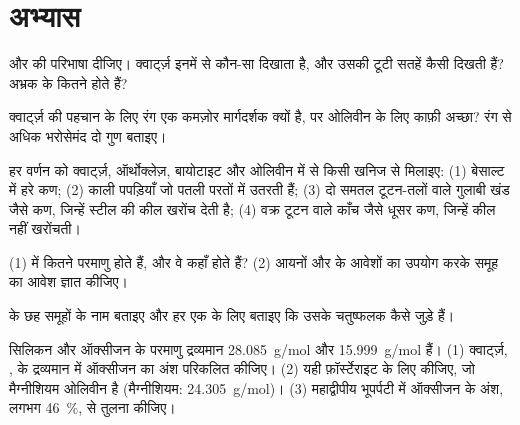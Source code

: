 \section{अभ्यास}

\begin{exercise}[$\star$]\label{exo:g11:minerals:1}
 और  की परिभाषा दीजिए। क्वार्ट्ज़ इनमें से कौन-सा दिखाता है, और उसकी
टूटी सतहें कैसी दिखती हैं? अभ्रक के कितने  होते हैं?
\end{exercise}

\begin{exercise}[$\star$]\label{exo:g11:minerals:2}
क्वार्ट्ज़ की पहचान के लिए रंग एक कमज़ोर मार्गदर्शक क्यों है, पर
ओलिवीन के लिए काफ़ी अच्छा? रंग से अधिक भरोसेमंद दो गुण बताइए।
\end{exercise}

\begin{exercise}[$\star$]\label{exo:g11:minerals:3}
हर वर्णन को क्वार्ट्ज़, ऑर्थोक्लेज़, बायोटाइट और
ओलिवीन में से किसी खनिज से मिलाइए: (1) बेसाल्ट में हरे कण; (2) काली पपड़ियाँ जो पतली
परतों में उतरती हैं; (3) दो समतल टूटन-तलों वाले गुलाबी खंड जैसे कण, जिन्हें
स्टील की कील खरोंच देती है; (4) वक्र टूटन वाले काँच जैसे धूसर कण, जिन्हें
कील नहीं खरोंचती।
\end{exercise}

\begin{exercise}[$\star$]\label{exo:g11:minerals:4}
(1)  में कितने परमाणु होते हैं, और वे कहाँ
होते हैं? (2) आयनों  और  के आवेशों का उपयोग करके समूह  का
आवेश ज्ञात कीजिए।
\end{exercise}

\begin{exercise}[$\star$]\label{exo:g11:minerals:5}
 के छह समूहों के नाम बताइए और हर एक के लिए बताइए कि
उसके चतुष्फलक कैसे जुड़े हैं।
\end{exercise}

\begin{exercise}[$\star\star$]\label{exo:g11:minerals:6}
सिलिकन और ऑक्सीजन के परमाणु द्रव्यमान \qty{28.085}{g/mol} और
\qty{15.999}{g/mol} हैं। (1) क्वार्ट्ज़,
, के द्रव्यमान में ऑक्सीजन का अंश परिकलित कीजिए। (2) यही फ़ॉर्स्टेराइट के लिए कीजिए, जो मैग्नीशियम ओलिवीन
 है (मैग्नीशियम: \qty{24.305}{g/mol})। (3) महाद्वीपीय भूपर्पटी में
ऑक्सीजन के अंश, लगभग \qty{46}{\percent}, से तुलना कीजिए।
\end{exercise}

